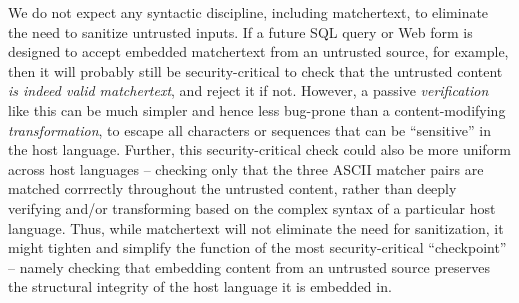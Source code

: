 We do not expect any syntactic discipline, including matchertext,
to eliminate the need to sanitize untrusted inputs.
If a future SQL query or Web form is designed to accept
embedded matchertext from an untrusted source, for example,
then it will probably still be security-critical to check
that the untrusted content \emph{is indeed valid matchertext},
and reject it if not.
However, a passive \emph{verification} like this
can be much simpler and hence less bug-prone
than a content-modifying \emph{transformation},
to escape all characters or sequences that can be ``sensitive''
in the host language.
Further, this security-critical check
could also be more uniform across host languages --
\ie checking only that the three ASCII matcher pairs are matched corrrectly
throughout the untrusted content,
rather than deeply verifying and/or transforming
based on the complex syntax of a particular host language.
Thus, while matchertext will not eliminate the need for sanitization,
it might tighten and simplify
the function of the most security-critical ``checkpoint'' --
namely checking that embedding content from an untrusted source
preserves the structural integrity
of the host language it is embedded in.

